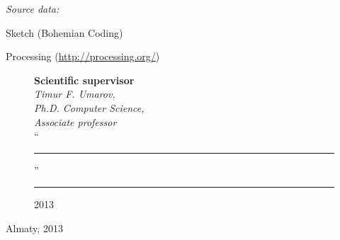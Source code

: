 \begin{titlepage}
    \emph{Source data:}
    
    \begin{compactitem}
    \item Sketch (Bohemian Coding)
    \item Processing (\url{http://processing.org/})
    \end{compactitem}


    \begin{figure}[ht]
            \begin{minipage}[t]{0.6\linewidth}
                {\bf Scientific supervisor}\\

                {\em Timur F. Umarov,\\
                Ph.D. Computer Science,\\
                Associate professor}\\
                
                ``\rule{2em}{0.4pt}'' \rule{8em}{0.4pt} 2013\\
         \end{minipage}
    \end{figure}
    
    \begin{center}
        \vfill
        Almaty, 2013
    \end{center}
  
    \end{titlepage}